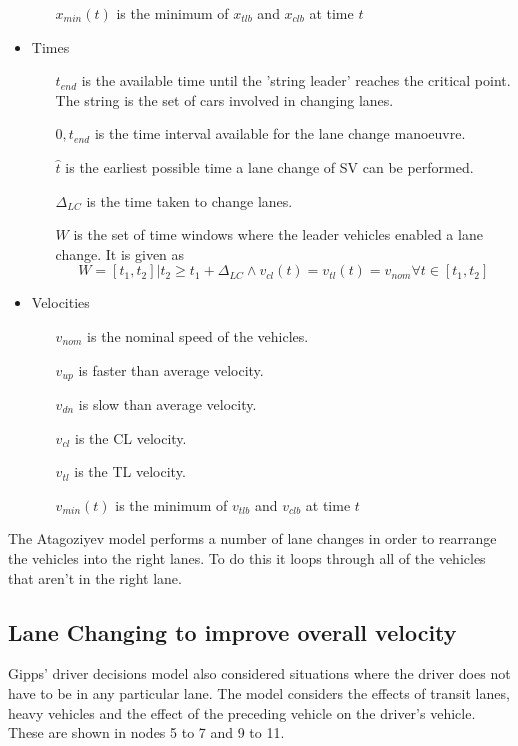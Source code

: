 \begin{itemize}
\begin{itemize}
\item[$x_{min}(t)$] is the minimum of $x_{tlb}$ and $x_{clb}$ at time $t$
\end{itemize}
\item Times
\begin{itemize}
\item[$t_{end}$] is the available time until the 'string leader' reaches the critical point. The string is the set of cars involved in changing lanes.
\item[$0,t_{end}$] is the time interval available for the lane change manoeuvre.
\item[$\hat{t}$] is the earliest possible time a lane change of SV can be performed.
\item[$\Delta_{LC}$] is the time taken to change lanes.
\item[$W$] is the set of time windows where the leader vehicles enabled a lane change. It is given as 
\begin{equation}
W = {[t_1,t_2]|t_2 \ge t_1 + \Delta_{LC} \land v_{cl}(t) = v_{tl}(t) = v_{nom} \forall t \in [t_1,t_2]}
\end{equation}
\end{itemize}
\item Velocities
\begin{itemize}
\item[$v_{nom}$] is the nominal speed of the vehicles.
\item[$v_{up}$] is faster than average velocity.
\item[$v_{dn}$] is slow than average velocity.
\item[$v_{cl}$] is the CL velocity.
\item[$v_{tl}$] is the TL velocity.
\item[$v_{min}(t)$] is the minimum of $v_{tlb}$ and $v_{clb}$ at time $t$
\end{itemize}
\end{itemize}

The Atagoziyev model performs a number of lane changes in order to rearrange the vehicles into the right lanes. To do this it loops through all of the vehicles that aren't in the right lane.


\subsection{Lane Changing to improve overall velocity}
\label{subsec:Lane Changing to improve overall velocity}
Gipps' driver decisions model also considered situations where the driver does not have to be in any particular lane. The model considers the effects of transit lanes, heavy vehicles and the effect of the preceding vehicle on the driver's vehicle. These are shown in nodes 5 to 7 and 9 to 11.

